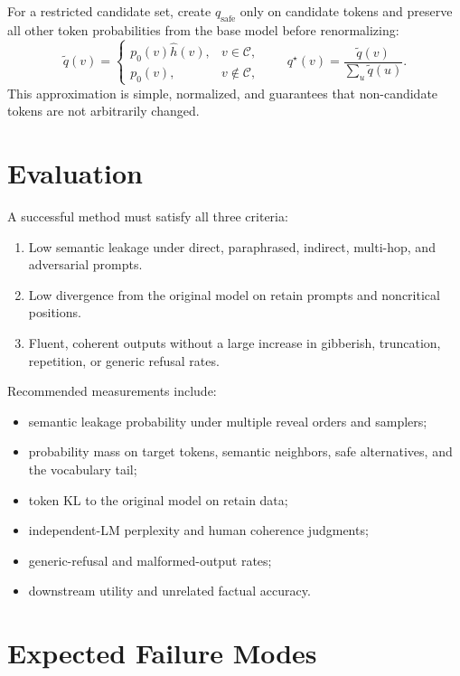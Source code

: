 \documentclass[10pt]{article}
\newcommand{\1}{\mathbb{I}}
\begin{document}
For a restricted candidate set, create $q_{\mathrm{safe}}$ only on candidate tokens and preserve all other token probabilities from the base model before renormalizing:
\begin{equation}
\widetilde q(v)=
\begin{cases}
p_0(v)\widehat h(v), & v\in\mathcal C,\\
p_0(v), & v\notin\mathcal C,
\end{cases}
\qquad
q^\star(v)=\frac{\widetilde q(v)}{\sum_u\widetilde q(u)}.
\label{eq:full_vocab_approx}
\end{equation}
This approximation is simple, normalized, and guarantees that non-candidate tokens are not arbitrarily changed.

\section{Evaluation}

A successful method must satisfy all three criteria:
\begin{enumerate}[leftmargin=*]
    \item Low semantic leakage under direct, paraphrased, indirect, multi-hop, and adversarial prompts.
    \item Low divergence from the original model on retain prompts and noncritical positions.
    \item Fluent, coherent outputs without a large increase in gibberish, truncation, repetition, or generic refusal rates.
\end{enumerate}

Recommended measurements include:
\begin{itemize}[leftmargin=*]
    \item semantic leakage probability under multiple reveal orders and samplers;
    \item probability mass on target tokens, semantic neighbors, safe alternatives, and the vocabulary tail;
    \item token KL to the original model on retain data;
    \item independent-LM perplexity and human coherence judgments;
    \item generic-refusal and malformed-output rates;
    \item downstream utility and unrelated factual accuracy.
\end{itemize}

\section{Expected Failure Modes}
\end{document}
